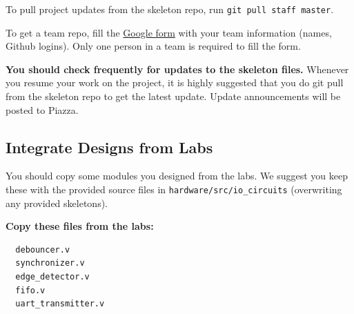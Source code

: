 \documentclass[11pt]{article}
\begin{document}
To pull project updates from the skeleton repo, run \verb|git pull staff master|.

To get a team repo, fill the \href{https://docs.google.com/forms/d/1hOJek4q_Z6SokflpH17gOESGGCXmY1VfdJ5VLMNku1U}{Google form} with your team information (names, Github logins). Only one person in a team is required to fill the form.

\textbf{You should check frequently for updates to the skeleton files.} Whenever you resume your work on the project,
it is highly suggested that you do git pull from the skeleton repo to get the latest update.
Update announcements will be posted to Piazza.

\subsection{Integrate Designs from Labs} \label{past_designs}
You should copy some modules you designed from the labs.
We suggest you keep these with the provided source files in \verb|hardware/src/io_circuits| (overwriting any provided skeletons).

\textbf{Copy these files from the labs:}
\begin{verbatim}
  debouncer.v
  synchronizer.v
  edge_detector.v
  fifo.v
  uart_transmitter.v
\end{verbatim}
\end{document}
